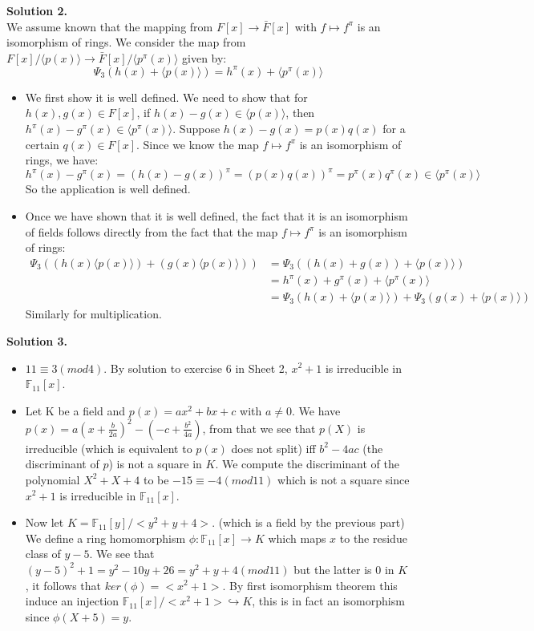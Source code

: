 \documentclass[12pt,a4paper]{article}
\begin{document}
\textbf{Solution 2.  }\\

We assume known that the mapping from $F[x]\rightarrow \bar{F}[x]$ with $f\mapsto f^{\pi}$ is an isomorphism of rings. 
We consider the map from $F[x]/\langle p(x)\rangle \rightarrow \bar{F}[x]/\langle p^{\pi}(x)\rangle$ given by: 
$$ \Psi_3(h(x)+\langle p(x)\rangle)=h^{\pi}(x)+\langle p^{\pi}(x)\rangle $$
\begin{itemize}
\item We first show it is well defined. We need to show that for $h(x), g(x)\in F[x]$, if $h(x)- g(x)\in \langle p(x)\rangle$, then $h^{\pi}(x)-g^{\pi}(x) \in \langle p^{\pi}(x)\rangle $. Suppose $h(x)- g(x)= p(x)q(x)$ for a certain $q(x)\in F[x]$.
Since we know the map $f\mapsto f^{\pi}$ is an isomorphism of rings, we have: 
$$
h^{\pi}(x)-g^{\pi}(x)=(h(x)- g(x))^{\pi}=(p(x)q(x))^{\pi}=p^{\pi}(x)q^{\pi}(x) \in \langle  p^{\pi}(x)\rangle 
$$
So the application is well defined. 
\item Once we have shown that it is well defined, the fact that it is an isomorphism of fields follows directly from the fact that the map $f\mapsto f^{\pi}$ is an isomorphism of rings:
\begin{align*}
\Psi_3((h(x)\langle p(x)\rangle)+(g(x)\langle p(x)\rangle))&=\Psi_3((h(x)+g(x))+\langle p(x)\rangle)\\
&=h^{\pi}(x)+g^{\pi}(x)+\langle p^{\pi}(x)\rangle \\
&= \Psi_3(h(x)+\langle p(x)\rangle)+\Psi_3(g(x)+\langle p(x)\rangle)
 \end{align*}
Similarly for multiplication. 


\end{itemize}


 
 \textbf{Solution 3. }

\begin{itemize}
    \item $11\equiv 3 (mod 4)$. By solution to exercise 6 in Sheet 2, $x^2+1$ is irreducible in $\mathbb{F}_{11}[x]$.
    \item Let K be a field and $p(x)=ax^2+bx+c$ with $a\neq 0$. We have $p(x)=a(x+\frac{b}{2a})^2-(-c+\frac{b^2}{4a})$, from that we see that $p(X)$ is irreducible (which is equivalent to $p(x)$ does not split) iff $b^2-4ac$ (the discriminant of $p$) is not a square in $K$. We compute the discriminant of the polynomial $X^2+X+4$ to be $-15\equiv -4 (mod 11)$ which is not a square since $x^2+1$ is irreducible in $\mathbb{F}_{11}[x]$.
    \item Now let $K=\mathbb{F}_{11}[y]/<y^2+y+4>$. (which is a field by the previous part) We define a ring homomorphism $\phi: \mathbb{F}_{11}[x] \xrightarrow{} K$ which maps $x$ to the residue class of $y-5$. We see that $(y-5)^2+1=y^2-10y+26=y^2+y+4 (mod 11)$ but the latter is $0$ in $K$, it follows that $ker(\phi)=<x^2+1> $. By first isomorphism theorem this induce an injection $\mathbb{F}_{11}[x]/<x^2+1>\hookrightarrow K$, this is in fact an isomorphism since $\phi(X+5)=y$.
\end{itemize}{}
\end{document}
